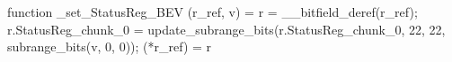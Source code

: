 function _set_StatusReg_BEV (r_ref, v) = {
    r = __bitfield_deref(r_ref);
    r.StatusReg_chunk_0 = update_subrange_bits(r.StatusReg_chunk_0, 22, 22, subrange_bits(v, 0, 0));
    (*r_ref) = r
}
